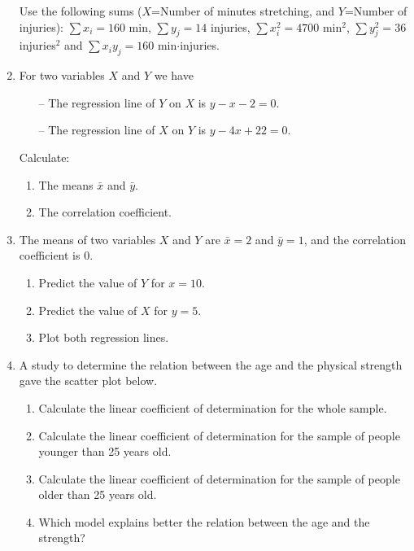 \begin{enumerate}[leftmargin=*,resume]
Use the following sums ($X$=Number of minutes stretching, and $Y$=Number of injuries):
$\sum x_i = 160$ min, $\sum y_j=14$ injuries, $\sum x_i^2= 4700$ min$^2$, $\sum y_j^2=36$ injuries$^2$ and $\sum
x_iy_j=160$  min$\cdot$injuries.

\item For two variables $X$ and $Y$ we have
\begin{itemize}
\item[--] The regression line of $Y$ on $X$ is $y-x-2=0$.
\item[--] The regression line of $X$ on $Y$ is $y-4x+22=0$.
\end{itemize}
Calculate:
\begin{enumerate}
\item The means $\bar x$ and $\bar y$.
\item The correlation coefficient.
\end{enumerate}

\item The means of two variables $X$ and $Y$ are $\bar x=2$ and $\bar y=1$, and the correlation coefficient is 0.
\begin{enumerate}
\item  Predict the value of $Y$ for $x=10$.
\item  Predict the value of $X$ for $y=5$.
\item  Plot both regression lines.
\end{enumerate}

\item A study to determine the relation between the age and the physical strength gave the scatter plot
below.
\begin{center}
\resizebox{0.7\textwidth}{!}{}
\end{center}

\begin{enumerate}
\item Calculate the linear coefficient of determination for the whole sample.
\item Calculate the linear coefficient of determination for the sample of people younger than 25 years old. 
\item Calculate the linear coefficient of determination for the sample of people older than 25 years old.
\item Which model explains better the relation between the age and the strength? 
\end{enumerate}


\end{enumerate}
